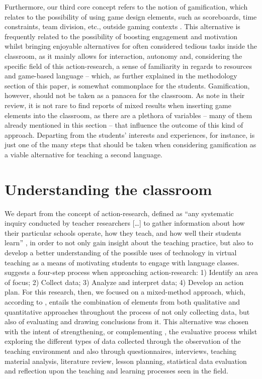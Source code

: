 \documentclass[english]{textolivre}
\begin{document}
Furthermore, our third core concept refers to the notion of gamification, which relates to the possibility of using game design elements, such as scoreboards, time constraints, team division, etc., outside gaming contexts \cite{deterding2011game, hanus2014assessing}. This alternative is frequently related to the possibility of boosting engagement and motivation whilst bringing enjoyable alternatives \cite{glover2013play, hanus2014assessing, koivisto2019rise} for often considered tedious tasks inside the classroom, as it mainly allows for interaction, autonomy and, considering the specific field of this action-research, a sense of familiarity in regards to resources and game-based language – which, as further explained in the methodology section of this paper, is somewhat commonplace for the students. Gamification, however, should not be taken as a panacea for the classroom. As \textcite{koivisto2019rise} note in their review, it is not rare to find reports of mixed results when inserting game elements into the classroom, as there are a plethora of variables – many of them already mentioned in this section – that influence the outcome of this kind of approach. Departing from the students’ interests and experiences, for instance, is just one of the many steps that should be taken when considering gamification as a viable alternative for teaching a second language.



\section{Understanding the classroom}

We depart from the concept of action-research, defined as “any systematic inquiry conducted by teacher researchers […] to gather information about how their particular schools operate, how they teach, and how well their students learn” \cite[p. 8]{mills2014action}, in order to not only gain insight about the teaching practice, but also to develop a better understanding of the possible uses of technology in virtual teaching as a means of motivating students to engage with language classes. \textcite[p. 18]{mills2014action} suggests a four-step process when approaching action-research: 1) Identify an area of focus; 2) Collect data; 3) Analyze and interpret data; 4) Develop an action plan. For this research, then, we focused on a mixed-method approach, which, according to \textcite{johnson2007toward}, entails the combination of elements from both qualitative and quantitative approaches throughout the process of not only collecting data, but also of evaluating and drawing conclusions from it. This alternative was chosen with the intent of strengthening, or complementing \cite{greene1989toward}, the evaluative process whilst exploring the different types of data collected through the observation of the teaching environment and also through questionnaires, interviews, teaching material analysis, literature review, lesson planning, statistical data evaluation and reflection upon the teaching and learning processes seen in the field.
\end{document}
